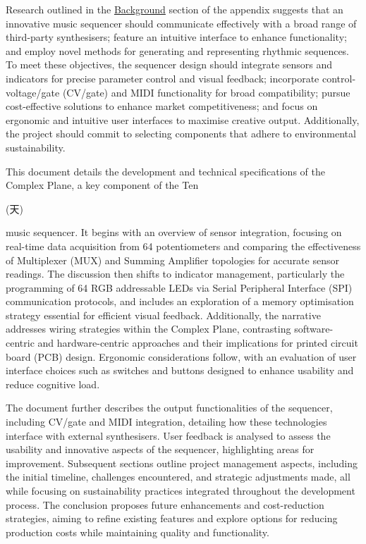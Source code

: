 \documentclass[12pt]{article}
\numberwithin{subsubsubsection}{subsubsection}
\begin{document}
Research outlined in the \hyperref[appendix:background]{Background} section of the appendix suggests that an innovative music sequencer should communicate effectively with a broad range of third-party synthesisers; feature an intuitive interface to enhance functionality; and employ novel methods for generating and representing rhythmic sequences. To meet these objectives, the sequencer design should integrate sensors and indicators for precise parameter control and visual feedback; incorporate control-voltage/gate (CV/gate) and MIDI functionality for broad compatibility; pursue cost-effective solutions to enhance market competitiveness; and focus on ergonomic and intuitive user interfaces to maximise creative output. Additionally, the project should commit to selecting components that adhere to environmental sustainability.

This document details the development and technical specifications of the Complex Plane, a key component of the Ten\begin{CJK}{UTF8}{min}(天)\end{CJK} music sequencer. It begins with an overview of sensor integration, focusing on real-time data acquisition from 64 potentiometers and comparing the effectiveness of Multiplexer (MUX) and Summing Amplifier topologies for accurate sensor readings. The discussion then shifts to indicator management, particularly the programming of 64 RGB addressable LEDs via Serial Peripheral Interface (SPI) communication protocols, and includes an exploration of a memory optimisation strategy essential for efficient visual feedback. Additionally, the narrative addresses wiring strategies within the Complex Plane, contrasting software-centric and hardware-centric approaches and their implications for printed circuit board (PCB) design. Ergonomic considerations follow, with an evaluation of user interface choices such as switches and buttons designed to enhance usability and reduce cognitive load.

The document further describes the output functionalities of the sequencer, including CV/gate and MIDI integration, detailing how these technologies interface with external synthesisers. User feedback is analysed to assess the usability and innovative aspects of the sequencer, highlighting areas for improvement. Subsequent sections outline project management aspects, including the initial timeline, challenges encountered, and strategic adjustments made, all while focusing on sustainability practices integrated throughout the development process. The conclusion proposes future enhancements and cost-reduction strategies, aiming to refine existing features and explore options for reducing production costs while maintaining quality and functionality.
\end{document}
